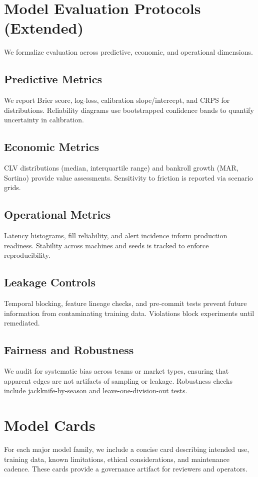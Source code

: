 \section{Model Evaluation Protocols (Extended)}\label{app:eval}
We formalize evaluation across predictive, economic, and operational dimensions.

\subsection{Predictive Metrics}
We report Brier score, log-loss, calibration slope/intercept, and CRPS for distributions. Reliability diagrams use bootstrapped confidence bands to quantify uncertainty in calibration.

\subsection{Economic Metrics}
CLV distributions (median, interquartile range) and bankroll growth (MAR, Sortino) provide value assessments. Sensitivity to friction is reported via scenario grids.

\subsection{Operational Metrics}
Latency histograms, fill reliability, and alert incidence inform production readiness. Stability across machines and seeds is tracked to enforce reproducibility.

\subsection{Leakage Controls}
Temporal blocking, feature lineage checks, and pre-commit tests prevent future information from contaminating training data. Violations block experiments until remediated.

\subsection{Fairness and Robustness}
We audit for systematic bias across teams or market types, ensuring that apparent edges are not artifacts of sampling or leakage. Robustness checks include jackknife-by-season and leave-one-division-out tests.

\section{Model Cards}\label{app:model-cards}
For each major model family, we include a concise card describing intended use, training data, known limitations, ethical considerations, and maintenance cadence. These cards provide a governance artifact for reviewers and operators.

